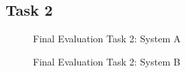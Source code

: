 \subsection*{Task 2}
\begin{figure}[!h]
  \centering
  \begin{minipage}[b]{0.47\textwidth}
    \caption{Final Evaluation Task 2: System A}
  \end{minipage}
  \hfill
  \begin{minipage}[b]{0.47\textwidth}
  \caption{Final Evaluation Task 2: System B}
  \end{minipage}
\end{figure}

\newpage
